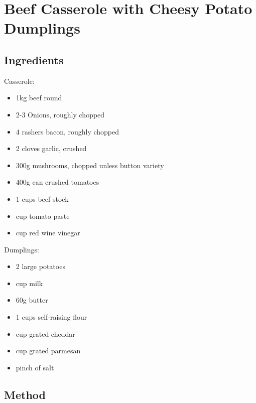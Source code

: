 \section{Beef Casserole with Cheesy Potato Dumplings}


\subsection{Ingredients}

Casserole:

\begin{itemize}
    \item 1kg beef round
    \item 2-3 Onions, roughly chopped
    \item 4 rashers bacon, roughly chopped
    \item 2 cloves garlic, crushed
    \item 300g mushrooms, chopped unless button variety
    \item 400g can crushed tomatoes
    \item 1 cups beef stock
    \item {} cup tomato paste
    \item {} cup red wine vinegar
\end{itemize}

Dumplings:

\begin{itemize}
    \item 2 large potatoes
    \item {} cup milk
    \item 60g butter
    \item 1 cups self-raising flour
    \item {} cup grated cheddar
    \item {} cup grated parmesan
    \item pinch of salt
\end{itemize}

\subsection{Method}

